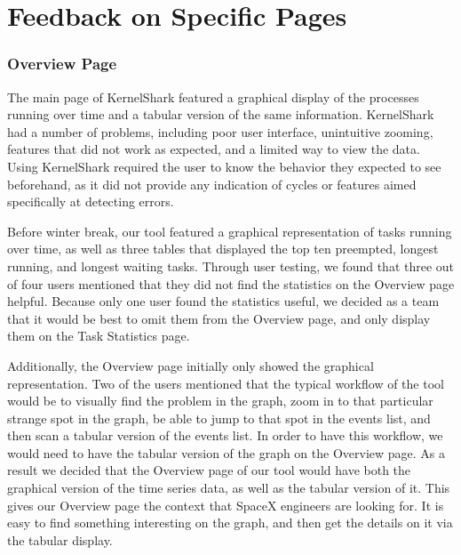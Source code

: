 \documentclass{hmcclinic}
\begin{document}
\section{Feedback on Specific Pages} %

\subsubsection{Overview Page}

The main page of KernelShark featured a graphical display of the processes
running over time and a tabular version of the same information. KernelShark had
a number of problems, including poor user interface, unintuitive zooming,
features that did not work as expected, and a limited way to view the data.
Using KernelShark required the user to know the behavior they expected to see
beforehand, as it did not provide any indication of cycles or features aimed
specifically at detecting errors.

Before winter break, our tool featured a graphical representation of tasks running over time,
as well as three tables that displayed the top ten preempted, longest running, and
longest waiting tasks. 
Through user testing, we found that three out of four users mentioned that they
did not find the statistics on the Overview page helpful. Because only one user found the statistics useful,
we decided as a team that it would be best to omit them from the Overview page, and
only display them on the Task Statistics page.

Additionally, the Overview page initially only showed the graphical
representation. Two of the users mentioned that the typical workflow of the tool
would be to visually find the problem in the graph, zoom in to that particular
strange spot in the graph, be able to jump to that spot in the events list, and
then scan a tabular version of the events list. In order to have this workflow,
we would need to have the tabular version of the graph on the Overview page.
As a result we decided that the Overview page of our tool would have both the
graphical version of the time series data, as well as the tabular version of it.
This gives our Overview page the context that SpaceX engineers are looking for.
It is easy to find something interesting on the graph, and then get the details
on it via the tabular display.
\end{document}
